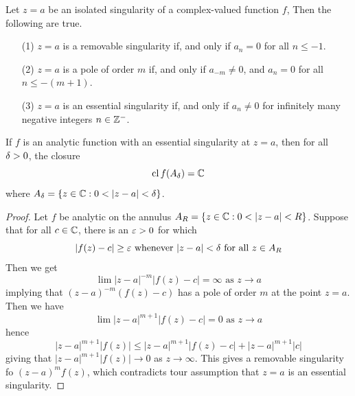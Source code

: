 \begin{corollary}
    Let $z=a$ be an isolated singularity of a complex-valued function  $f$, Then
    the following are true.
    \begin{enumerate}
        \item[(1)] $z=a$ is a removable singularity if, and only if  $a_n=0$ for
            all  $n \leq -1$.

        \item[(2)] $z=a$ is a pole of order  $m$ if, and only if  $a_{-m} \neq
            0$, and $a_n=0$ for all  $n \leq -(m+1)$.

        \item[(3)] $z=a$ is an essential singularity if, and only if $a_n \neq 0$
            for infinitely many negative integers  $n \in \mathbb{Z}^-$.
    \end{enumerate}
\end{corollary}

\begin{theorem}\label{5.1.4}
    If $f$ is an analytic function with an essential singularity at $z=a$,
    then for all  $\delta>0$, the closure
    \begin{equation*}
        \operatorname{cl}{f(A_\delta)}=\mathbb{C}
    \end{equation*}
    where $A_\d=\{z \in \C : 0<|z-a|<\d\}$.
\end{theorem}
\begin{proof}
    Let $f$ be analytic on the annulus $A_R=\{z \in \C : 0<|z-a|<R\}$. Suppose
    that for all $c \in \mathbb{C}$, there is an $\varepsilon>0$ for which
    \begin{equation*}
        |f(z)-c| \geq \varepsilon \text{ whenever } |z-a|<\delta \text{ for all } z \in A_R
    \end{equation*}
    Then we get
    \begin{equation*}
        \lim{|z-a|^{-m}|f(z)-c|}=\infty \text{ as } z \xrightarrow{} a
    \end{equation*}
    implying that $(z-a)^{-m}(f(z)-c)$ has a pole of order $m$ at the point
    $z=a$. Then we have
    \begin{equation*}
        \lim{|z-a|^{m+1}|f(z)-c|}=0 \text{ as } z \xrightarrow{} a
    \end{equation*}
    hence
    \begin{equation*}
        |z-a|^{m+1}|f(z)| \leq |z-a|^{m+1}|f(z)-c|+|z-a|^{m+1}|c|
    \end{equation*}
    giving that $|z-a|^{m+1}|f(z)| \xrightarrow{} 0$ as $z \xrightarrow{}
    \infty$. This gives a removable singularity fo $(z-a)^mf(z)$, which
    contradicts tour assumption that $z=a$ is an essential singularity.
\end{proof}
